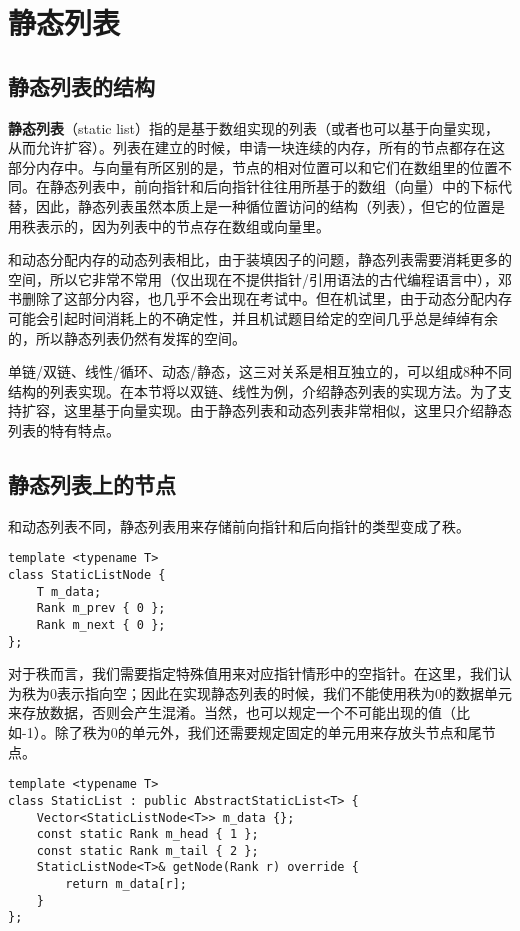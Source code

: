 \section{静态列表}

\subsection{静态列表的结构}

\textbf{静态列表}（static list）指的是基于数组实现的列表（或者也可以基于向量实现，从而允许扩容）。列表在建立的时候，申请一块连续的内存，所有的节点都存在这部分内存中。与向量有所区别的是，节点的相对位置可以和它们在数组里的位置不同。在静态列表中，前向指针和后向指针往往用所基于的数组（向量）中的下标代替，因此，静态列表虽然本质上是一种循位置访问的结构（列表），但它的位置是用秩表示的，因为列表中的节点存在数组或向量里。

和动态分配内存的动态列表相比，由于装填因子的问题，静态列表需要消耗更多的空间，所以它非常不常用（仅出现在不提供指针/引用语法的古代编程语言中），邓书删除了这部分内容，也几乎不会出现在考试中。但在机试里，由于动态分配内存可能会引起时间消耗上的不确定性，并且机试题目给定的空间几乎总是绰绰有余的，所以静态列表仍然有发挥的空间。

单链/双链、线性/循环、动态/静态，这三对关系是相互独立的，可以组成8种不同结构的列表实现。在本节将以双链、线性为例，介绍静态列表的实现方法。为了支持扩容，这里基于向量实现。由于静态列表和动态列表非常相似，这里只介绍静态列表的特有特点。

\subsection{静态列表上的节点}

和动态列表不同，静态列表用来存储前向指针和后向指针的类型变成了秩。
\begin{lstlisting}
template <typename T>
class StaticListNode {
    T m_data;
    Rank m_prev { 0 };
    Rank m_next { 0 };
};
\end{lstlisting}

对于秩而言，我们需要指定特殊值用来对应指针情形中的空指针。在这里，我们认为秩为0表示指向空；因此在实现静态列表的时候，我们不能使用秩为0的数据单元来存放数据，否则会产生混淆。当然，也可以规定一个不可能出现的值（比如-1）。除了秩为0的单元外，我们还需要规定固定的单元用来存放头节点和尾节点。

\begin{lstlisting}
template <typename T>
class StaticList : public AbstractStaticList<T> {
    Vector<StaticListNode<T>> m_data {};
    const static Rank m_head { 1 };
    const static Rank m_tail { 2 };
    StaticListNode<T>& getNode(Rank r) override {
        return m_data[r];
    }
};
\end{lstlisting}

